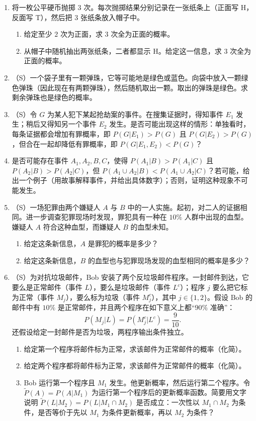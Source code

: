 \documentclass[UTF8, 12pt, fontset=fandol, oneside]{ctexart}
\begin{document}
\begin{enumerate}
  \item 将一枚公平硬币抛掷 $3$ 次。每次抛掷结果分别记录在一张纸条上（正面写 H，反面写 T），然后把 $3$ 张纸条放入帽子中。
  \begin{enumerate}
    \item 给定至少 $2$ 次为正面，求 $3$ 次全为正面的概率。
    \item 从帽子中随机抽出两张纸条，二者都显示 H。给定这一信息，求 $3$ 次全为正面的概率。
  \end{enumerate}

  \item （S）一个袋子里有一颗弹珠，它等可能地是绿色或蓝色。向袋中放入一颗绿色弹珠（因此现在有两颗弹珠），然后随机取出一颗。取出的弹珠是绿色。求剩余弹珠也是绿色的概率。

  \item （S）令 $G$ 为某人犯下某起抢劫案的事件。在搜集证据时，得知事件 $E_1$ 发生；稍后又得知另一个事件 $E_2$ 发生。是否可能出现这样的情形：单独看时，每条证据都会增加有罪概率，即 $P(G|E_1)>P(G)$ 且 $P(G|E_2)>P(G)$，但合在一起却降低有罪概率，即 $P(G|E_1,E_2)<P(G)$？

  \item 是否可能存在事件 $A_1,A_2,B,C$，使得 $P(A_1|B)>P(A_1|C)$ 且 $P(A_2|B)>P(A_2|C)$，但 $P(A_1\cup A_2|B)<P(A_1\cup A_2|C)$？若可能，给出一个例子（用故事解释事件，并给出具体数字）；否则，证明这种现象不可能发生。

  \item （S）一场犯罪由两个嫌疑人 $A$ 与 $B$ 中的一人实施。起初，对二人的证据相同。进一步调查犯罪现场时发现，罪犯具有一种在 $10\%$ 人群中出现的血型。嫌疑人 $A$ 符合这种血型，而嫌疑人 $B$ 的血型未知。
  \begin{enumerate}
    \item 给定这条新信息，$A$ 是罪犯的概率是多少？
    \item 给定这条新信息，$B$ 的血型也与犯罪现场发现的血型相同的概率是多少？
  \end{enumerate}

  \item （S）为对抗垃圾邮件，Bob 安装了两个反垃圾邮件程序。一封邮件到达，它要么是正常邮件（事件 $L$），要么是垃圾邮件（事件 $L^c$）；程序 $j$ 要么把它标为正常（事件 $M_j$），要么标为垃圾（事件 $M_j^c$），其中 $j\in\{1,2\}$。假设 Bob 的邮件中有 $10\%$ 是正常邮件，并且两个程序在如下意义上都“$90\%$ 准确”：
  \[
    P(M_j|L)=P(M_j^c|L^c)=\frac9{10}.
  \]
  还假设给定一封邮件是否为垃圾，两程序输出条件独立。
  \begin{enumerate}
    \item 给定第一个程序将邮件标为正常，求该邮件为正常邮件的概率（化简）。
    \item 给定两个程序都将邮件标为正常，求该邮件为正常邮件的概率（化简）。
    \item Bob 运行第一个程序且 $M_1$ 发生。他更新概率，然后运行第二个程序。令 $\widetilde P(A)=P(A|M_1)$ 为运行第一个程序后的更新概率函数。简要用文字说明 $\widetilde P(L|M_2)=P(L|M_1\cap M_2)$ 是否成立：一次性以 $M_1\cap M_2$ 为条件，是否等价于先以 $M_1$ 为条件更新概率，再以 $M_2$ 为条件？
  \end{enumerate}


\end{enumerate}
\end{document}
